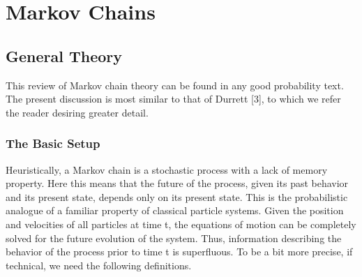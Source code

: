 \documentclass{au}
\numberwithin{equation}{section}
\theoremstyle{plain}
\theoremstyle{definition}
\newcommand{\<}{\ensuremath{\langle}}
\renewcommand{\>}{\ensuremath{\rangle}}
\begin{document}
\chapter{Markov Chains}

\section{General Theory}

This review of Markov chain theory can be found in any good probability text. The present
discussion is most similar to that of Durrett [3], to which we refer the reader desiring greater detail.

\subsection{The Basic Setup}

Heuristically, a Markov chain is a stochastic process with a lack of memory property. Here
this means that the future of the process, given its past behavior and its present state, depends only
on its present state. This is the probabilistic analogue of a familiar property of classical particle
systems. Given the position and velocities of all particles at time t, the equations of motion can be
completely solved for the future evolution of the system. Thus, information describing the behavior
of the process prior to time t is superﬂuous. To be a bit more precise, if technical, we need the
following definitions.



\end{document}
